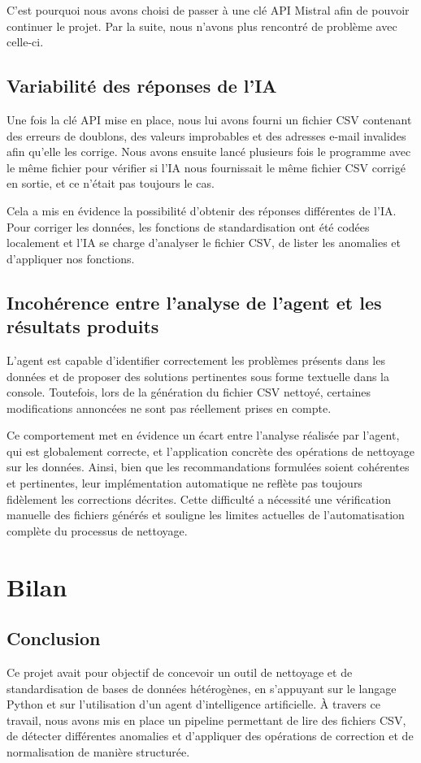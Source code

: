 \documentclass[a4paper, 12pt, twoside]{article}
\begin{document}
C’est pourquoi nous avons choisi de passer à une clé API Mistral afin de pouvoir continuer le projet. Par la suite, nous n’avons plus rencontré de problème avec celle-ci.

    \subsection{Variabilité des réponses de l'IA}
Une fois la clé API mise en place, nous lui avons fourni un fichier CSV contenant des erreurs de doublons, des valeurs improbables et des adresses e-mail invalides afin qu’elle les corrige. Nous avons ensuite lancé plusieurs fois le programme avec le même fichier pour vérifier si l’IA nous fournissait le même fichier CSV corrigé en sortie, et ce n’était pas toujours le cas.

Cela a mis en évidence la possibilité d’obtenir des réponses différentes de l’IA. Pour corriger les données, les fonctions de standardisation ont été codées localement et l’IA se charge d’analyser le fichier CSV, de lister les anomalies et d’appliquer nos fonctions.

    \subsection{Incohérence entre l’analyse de l’agent et les résultats produits}
L’agent est capable d’identifier correctement les problèmes présents dans les données et de proposer des solutions pertinentes sous forme textuelle dans la console. Toutefois, lors de la génération du fichier CSV nettoyé, certaines modifications annoncées ne sont pas réellement prises en compte.

Ce comportement met en évidence un écart entre l’analyse réalisée par l’agent, qui est globalement correcte, et l’application concrète des opérations de nettoyage sur les données. Ainsi, bien que les recommandations formulées soient cohérentes et pertinentes, leur implémentation automatique ne reflète pas toujours fidèlement les corrections décrites. Cette difficulté a nécessité une vérification manuelle des fichiers générés et souligne les limites actuelles de l’automatisation complète du processus de nettoyage.

\newpage
\section{Bilan}
	\subsection{Conclusion}
Ce projet avait pour objectif de concevoir un outil de nettoyage et de standardisation de bases de données hétérogènes, en s’appuyant sur le langage Python et sur l’utilisation d’un agent d’intelligence artificielle. À travers ce travail, nous avons mis en place un pipeline permettant de lire des fichiers CSV, de détecter différentes anomalies et d’appliquer des opérations de correction et de normalisation de manière structurée.
\end{document}
